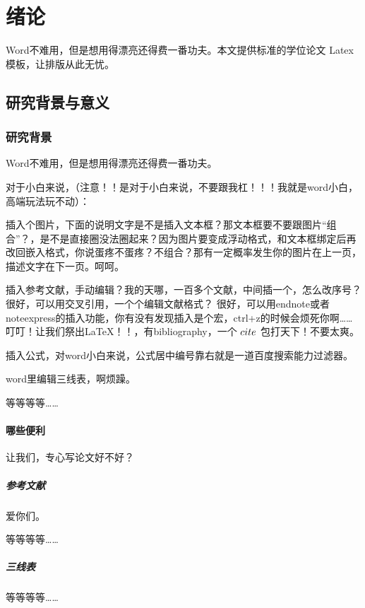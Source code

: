 \section{绪论}

Word不难用，但是想用得漂亮还得费一番功夫。本文提供标准的学位论文 Latex 模板，让排版从此无忧。

\subsection{研究背景与意义}

\subsubsection{研究背景}

Word不难用，但是想用得漂亮还得费一番功夫。

对于小白来说，（注意！！是对于小白来说，不要跟我杠！！！我就是word小白，高端玩法玩不动）：

插入个图片，下面的说明文字是不是插入文本框？那文本框要不要跟图片“组合”？，是不是直接圈没法圈起来？因为图片要变成浮动格式，和文本框绑定后再改回嵌入格式，你说蛋疼不蛋疼？不组合？那有一定概率发生你的图片在上一页，描述文字在下一页。呵呵。

插入参考文献，手动编辑？我的天哪，一百多个文献，中间插一个，怎么改序号？
很好，可以用交叉引用，一个个编辑文献格式？
很好，可以用endnote或者noteexpress的插入功能，你有没有发现插入是个宏，ctrl+z的时候会烦死你啊……
叮叮！让我们祭出LaTeX！！，有bibliography，一个 $\\cite$ 包打天下！不要太爽。

插入公式，对word小白来说，公式居中编号靠右就是一道百度搜索能力过滤器。

word里编辑三线表，啊烦躁。

等等等等……

\paragraph{哪些便利}

让我们，专心写论文好不好？

\subparagraph{参考文献}

爱你们。

等等等等……

\subparagraph{三线表}

等等等等……


